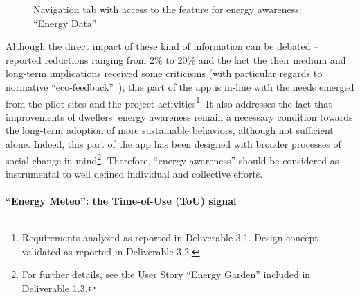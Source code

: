 \begin{figure}[htb]
\centering
{}
\caption{Navigation tab with access to the feature for energy awareness: ``Energy Data''}\label{fig:tab}
\end{figure}

Although the direct impact of these kind of information can be debated -- reported reductions ranging from 2\% to 20\% \citep{eea_report} and the fact the their medium and
long-term implications received some criticisms (with particular regards to normative ``eco-feedback''~\citep{Strengers2012,Cakici2014}), this part of the app is in-line with the needs emerged from
the pilot sites and the project activities\footnote{Requirements analyzed as reported in Deliverable 3.1. Design concept validated as reported in Deliverable 3.2.}.
It also addresses the fact that improvements of dwellers' energy awareness remain a necessary condition towards the long-term adoption of more sustainable behaviors,
although not sufficient alone. Indeed, this part of the app has been designed with broader processes of social change
in mind\footnote{For further details, see the User Story ``Energy Garden'' included in Deliverable 1.3.}. Therefore, ``energy awareness'' should be considered as instrumental to
well defined individual and collective efforts. 


\paragraph{``Energy Meteo'': the Time-of-Use (ToU) signal} 

